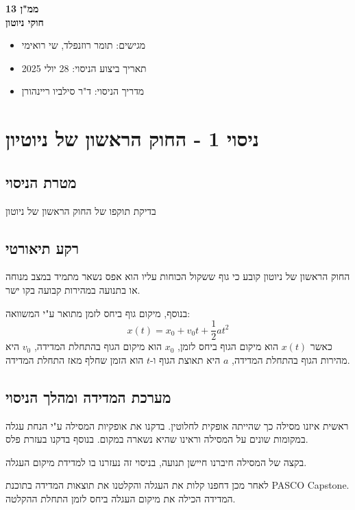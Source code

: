 \documentclass[14pt]{extarticle}
\begin{document}
\begin{center}
    {\LARGE \textbf{ממ"ן 13}}\\
    {\textbf{חוקי ניוטון}}
\end{center}

\begin{itemize}
    \item מגישים: תומר רוזנפלד, שי רואימי
    \item תאריך ביצוע הניסוי: 28 יולי 2025
    \item מדריך הניסוי: ד"ר סילביו ריינהורן
\end{itemize}
\newpage

\section*{ניסוי 1 - החוק הראשון של ניוטיון}
\subsection*{מטרת הניסוי}
בדיקת תוקפו של החוק הראשון של ניוטון
\subsection*{רקע תיאורטי}
החוק הראשון של ניוטון קובע כי גוף ששקול הכוחות עליו הוא אפס נשאר מתמיד במצב מנוחה או בתנועה במהירות קבועה בקו ישר.

בנוסף, מיקום גוף ביחס לזמן מתואר ע"י המשוואה:
\begin{equation}
x(t) = x_0 + v_0 t + \frac{1}{2} a t^2
\end{equation}
כאשר $x(t)$ הוא מיקום הגוף ביחס לזמן, $x_0$ הוא מיקום הגוף בהתחלת המדידה, $v_0$ היא מהירות הגוף בהתחלת המדידה, $a$ היא תאוצת הגוף ו-$t$ הוא הזמן שחלף מאז התחלת המדידה.

\subsection*{מערכת המדידה ומהלך הניסוי}
ראשית איזנו מסילה כך שהייתה אופקית לחלוטין. בדקנו את אופקיות המסילה ע"י הנחת עגלה במקומות שונים על המסילה וראינו שהיא נשארה במקום.  בנוסף בדקנו בעזרת פלס.

בקצה של המסילה חיברנו חיישן תנועה, בניסוי זה  נעזרנו בו למדידת מיקום העגלה.

לאחר מכן דחפנו קלות את העגלה והקלטנו את תוצאות המדידה בתוכנת PASCO Capstone. המדידה הכילה את מיקום העגלה ביחס לזמן התחלת ההקלטה.
\end{document}
